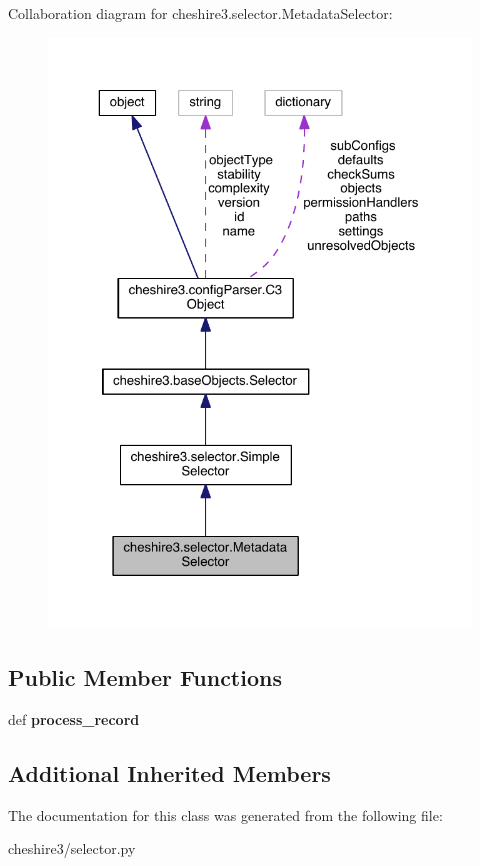 Collaboration diagram for cheshire3.\-selector.\-Metadata\-Selector\-:
\nopagebreak
\begin{figure}[H]
\begin{center}
\leavevmode
\includegraphics[width=325pt]{classcheshire3_1_1selector_1_1_metadata_selector__coll__graph}
\end{center}
\end{figure}
\subsection*{Public Member Functions}
\begin{DoxyCompactItemize}
\item 
\hypertarget{classcheshire3_1_1selector_1_1_metadata_selector_abc73bae50aab12f03296cd9ff1f0f5f1}{def {\bfseries process\-\_\-record}}\label{classcheshire3_1_1selector_1_1_metadata_selector_abc73bae50aab12f03296cd9ff1f0f5f1}

\end{DoxyCompactItemize}
\subsection*{Additional Inherited Members}


The documentation for this class was generated from the following file\-:\begin{DoxyCompactItemize}
\item 
cheshire3/selector.\-py\end{DoxyCompactItemize}
